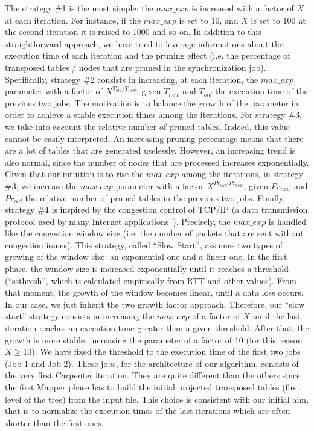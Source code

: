 The strategy \#1 is the most simple: the $max\_exp$ is increased with a factor of $X$ at each iteration. For instance, if the $max\_exp$ is set to 10, and $X$ is set to 100 at the second iteration it is raised to 1000 and so on.
In addition to this straightforward approach, we have tried to leverage informations about the execution time of each iteration and the pruning effect (i.e. the percentage of transposed tables / nodes that are pruned in the synchronization job). 
Specifically, strategy \#2 consists in increasing, at each iteration, the $max\_exp$ parameter with a factor of  $X^{T_{old} / T_{new}}$, given $T_{new}$ and  $T_{old}$ the execution time of the previous two jobs. The motivation is to balance the growth of the parameter in order to achieve a stable execution times among the iterations.  
For strategy \#3, we take into account the relative number of pruned tables. Indeed, this value cannot be easily interpreted. An increasing pruning percentage means that there are a lot of tables that are generated uselessly. However, an increasing trend is also normal, since the number of nodes that are processed increases exponentially. Given that our intuition is to rise the  $max\_exp$ among the iterations, in strategy \#3, we increase the $max\_exp$ parameter with a factor $X^{Pr_{old} / Pr_{new}}$, given $Pr_{new}$ and  $Pr_{old}$ the relative number of pruned tables in the previous two jobs. 
Finally, strategy \#4 is inspired by the congestion control of TCP/IP (a data transmission protocol used by many Internet applications~\cite{Jacobson:1988:CAC:52325.52356}). Precisely, the $max\_exp$ is handled like the congestion window size (i.e. the number of packets that are sent without congestion issues).
This strategy, called ``Slow Start'', assumes two types of growing of the window size: an exponential one and a linear one. In the first phase, the window size is increased exponentially until it reaches a threshold (``ssthresh'', which is calculated empirically from RTT and other values). From that moment, the growth of the window becomes linear, until a data loss occurs.
In our case, we just inherit the two growth factor approach. Therefore, our ``slow start'' strategy consists in increasing the $max\_exp$ of a factor of $X$ until the last iteration reaches an execution time greater than a given threshold. After that, the growth is more stable, increasing the parameter of a factor of 10 (for this reason $X\geq10$).
We have fixed the threshold to the execution time of the first two jobs (Job 1 and Job 2). These jobs, for the architecture of our algorithm, consists of the very first Carpenter iteration. They are quite different than the others since the first Mapper phase has to build the initial projected transposed tables (first level of the tree) from the input file. This choice is consistent with our initial aim, that is to normalize the execution times of the last iterations which are often shorter than the first ones.
